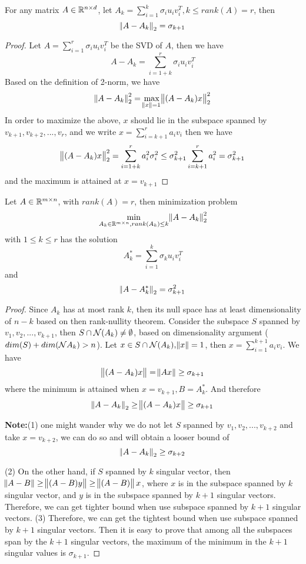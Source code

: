 \begin{refsection}
\begin{lemma}
For any matrix $A\in \mathbb{R}^{n\times d}$, let $A_k = \sum_{i=1}^k \sigma_i u_iv_i^T, k\leq rank(A)=r$, then
$$\norm{A-A_k}_2 = \sigma_{k+1}$$
\end{lemma}
\begin{proof}
Let $A = \sum_{i=1}^r \sigma_i u_iv_i^T$ be the SVD of $A$, then we have
$$A-A_k = \sum_{i=1+k}^r \sigma_i u_iv_i^T$$
Based on the definition of 2-norm, we have
$$\norm{A-A_k}^2_2 = \max_{\norm{x}=1} \norm{(A-A_k)x}^2_2$$
In order to maximize the above, $x$ should lie in the subspace spanned by $v_{k+1},v_{k+2},...,v_r$, and we write $x=\sum_{i=k+1}^r a_i v_i$
then we have
$$\norm{(A-A_k)x}^2_2 = \sum_{i=1+k}^r a_i^2 \sigma_i^2 \leq \sigma^2_{k+1}\sum_{i=k+1}^r a_i^2 =\sigma^2_{k+1} $$
and the maximum is attained at $x=v_{k+1}$
\end{proof}


\begin{theorem}\label{ch:linearalgebra:th:SVD2normlowrankapproximation}
Let $A \in \mathbb{R}^{m\times n}$, with $rank(A)=r$, then minimization problem
$$\min_{A_k \in \mathbb{R}^{m\times n},rank(A_k)\leq k} \norm{A-A_k}^2_2$$
with $1\leq k\leq r$ has the solution
$$A_k^* = \sum_{i=1}^k \sigma_k u_i v_i^T$$
and 
$$\norm{A-A_k^*}_2 = \sigma^2_{k+1}$$
\end{theorem}
\begin{proof}
Since $A_k$ has at most rank $k$, then its null space has at least dimensionality of $n-k$ based on then rank-nullity theorem. Consider the subspace $S$ spanned by $ v_{1},v_{2},...,v_{k+1}$, then $S\cap \mathcal{N}(A_k)\neq \emptyset$, based on dimensionality argument ($dim(S)+dim(\mathcal{N}{A_k})>n$). Let $x\in S\cap \mathcal{N}(A_k),\norm{x}=1$, then $x=\sum_{i=1}^{k+1}a_i v_i$. We have
$$\norm{(A-A_k)x} = \norm{Ax} \geq \sigma_{k+1}$$
where the minimum is attained when $x = v_{k+1}, B=A_k^*$. And therefore $$\norm{A-A_k}_2 \geq \norm{(A-A_k)x} \geq \sigma_{k+1}$$

\textbf{Note:}(1) one might wander why we do not let $S$ spanned by $ v_{1},v_{2},...,v_{k+2}$ and take $x=v_{k+2}$, we can do so and will obtain a looser bound of $$\norm{A-A_k}_2 \geq \sigma_{k+2}$$

(2) On the other hand, if $S$ spanned by $k$ singular vector, then $\norm{A-B} \geq \norm{(A-B)y} \geq \norm{(A-B)}x$, where $x$ is in the subspace spanned by $k$ singular vector, and $y$ is in the subspace spanned by $k+1$ singular vectors. Therefore, we can get tighter bound when use subspace spanned by $k+1$ singular vectors. 
(3) Therefore, we can get the tightest bound when use subspace spanned by $k+1$ singular vectors. Then it is easy to  prove that among all the subspaces span by the $k+1$ singular vectors, the maximum of the minimum in the $k+1$ singular values is $\sigma_{k+1}$. 


\end{proof}
\end{refsection}
